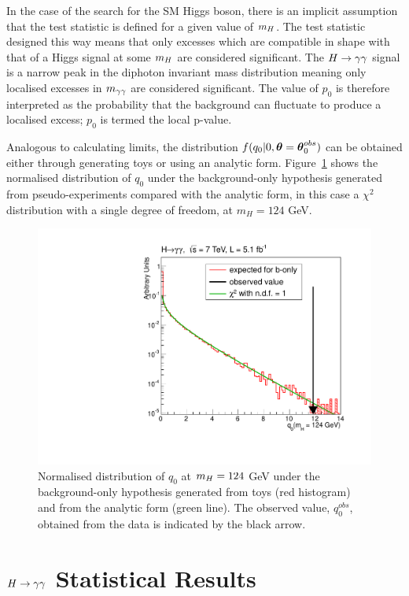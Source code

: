 In the case of the search for the SM Higgs boson, there is an implicit assumption that
the test statistic is defined for a given value of $m_{H}$. The test statistic designed this way
means that only excesses which are compatible in shape with that of a Higgs signal at some $m_{H}$
are considered significant. The $H\rightarrow\gamma\gamma$ signal is a narrow peak in the diphoton invariant mass distribution
meaning only localised excesses in $m_{\gamma\gamma}$ are considered significant.
The value of $p_{0}$ is therefore interpreted as the probability that the background can 
fluctuate to produce a localised excess; $p_{0}$ is termed the local p-value.

Analogous to calculating limits, the distribution $f(q_{0} |0,{\boldsymbol{\theta}}={\boldsymbol{\theta}}_{0}^{obs})$ can be obtained either
through generating toys or using an analytic form. Figure~\ref{fig:q0dist} shows the normalised distribution
of $q_{0}$ under the background-only hypothesis generated from pseudo-experiments compared with the 
analytic form, in this case a $\chi^{2}$ distribution with a single degree of freedom, at $m_{H}=124$ GeV.

\begin{figure}
\begin{center}
  \includegraphics[width=.8\textwidth]{hgg7TeV/statsPlots/q0_example_125_chi2_sqr.pdf}
\end{center}
 \caption{Normalised distribution of $q_{0}$ at $m_{H}=124$ GeV under the background-only 
 hypothesis generated  from toys (red histogram) and from the analytic form (green line). 
 The observed value, $q_{0}^{obs}$, obtained from the data is indicated by the black arrow.}
 \label{fig:q0dist}
\end{figure}
 


\section{$H\rightarrow\gamma\gamma$ Statistical Results}
\label{sec:hggresults2011}

